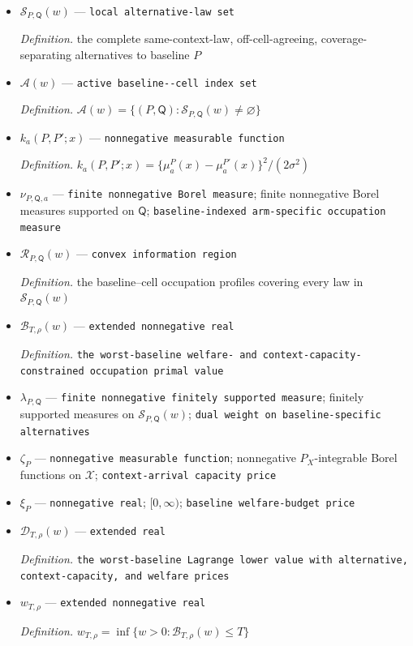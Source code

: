 \documentclass{article}
\begin{document}
\begin{itemize}
  \par\smallskip\noindent\emph{Definition.} the targeting-gain functional evaluated under \(P'\)
  \item \(\mathcal S_{P,\mathsf Q}(w)\) --- \texttt{local alternative-\allowbreak{}law set}
  \par\smallskip\noindent\emph{Definition.} the complete same-context-law, off-cell-agreeing, coverage-separating alternatives to baseline \(P\)
  \item \(\mathscr A(w)\) --- \texttt{active baseline-\allowbreak{}-\allowbreak{}cell index set}
  \par\smallskip\noindent\emph{Definition.} \(\mathscr A(w)=\{(P,\mathsf Q):\mathcal S_{P,\mathsf Q}(w)\ne\varnothing\}\)
  \item \(k_a(P,P';x)\) --- \texttt{nonnegative measurable function}
  \par\smallskip\noindent\emph{Definition.} \(k_a(P,P';x)=\{\mu_a^P(x)-\mu_a^{P'}(x)\}^2/(2\sigma^2)\)
  \item \(\nu_{P,\mathsf Q,a}\) --- \texttt{finite nonnegative Borel measure}; finite nonnegative Borel measures supported on \(\mathsf Q\); \texttt{baseline-\allowbreak{}indexed arm-\allowbreak{}specific occupation measure}
  \item \(\mathcal R_{P,\mathsf Q}(w)\) --- \texttt{convex information region}
  \par\smallskip\noindent\emph{Definition.} the baseline--cell occupation profiles covering every law in \(\mathcal S_{P,\mathsf Q}(w)\)
  \item \(\mathcal B_{T,\rho}(w)\) --- \texttt{extended nonnegative real}
  \par\smallskip\noindent\emph{Definition.} \texttt{the worst-\allowbreak{}baseline welfare-\allowbreak{} and context-\allowbreak{}capacity-\allowbreak{}constrained occupation primal value}
  \item \(\lambda_{P,\mathsf Q}\) --- \texttt{finite nonnegative finitely supported measure}; finitely supported measures on \(\mathcal S_{P,\mathsf Q}(w)\); \texttt{dual weight on baseline-\allowbreak{}specific alternatives}
  \item \(\zeta_P\) --- \texttt{nonnegative measurable function}; nonnegative \(P_X\)-integrable Borel functions on \(\mathcal X\); \texttt{context-\allowbreak{}arrival capacity price}
  \item \(\xi_P\) --- \texttt{nonnegative real}; \([0,\infty)\); \texttt{baseline welfare-\allowbreak{}budget price}
  \item \(\mathcal D_{T,\rho}(w)\) --- \texttt{extended real}
  \par\smallskip\noindent\emph{Definition.} \texttt{the worst-\allowbreak{}baseline Lagrange lower value with alternative,\allowbreak{} context-\allowbreak{}capacity,\allowbreak{} and welfare prices}
  \item \(w_{T,\rho}\) --- \texttt{extended nonnegative real}
  \par\smallskip\noindent\emph{Definition.} \(w_{T,\rho}=\inf\{w>0:\mathcal B_{T,\rho}(w)\le T\}\)
\end{itemize}
\end{document}
